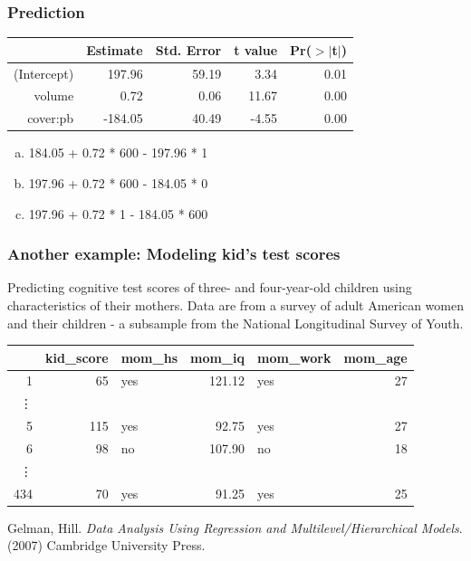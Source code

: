 \begin{frame}
\frametitle{Prediction}


{\small
\begin{center}
\begin{tabular}{rrrrr}
  \hline
 & Estimate & Std. Error & t value & Pr($>$$|$t$|$) \\ 
  \hline
(Intercept) & 197.96 & 59.19 & 3.34 & 0.01 \\ 
  volume & 0.72 & 0.06 & 11.67 & 0.00 \\ 
  cover:pb & -184.05 & 40.49 & -4.55 & 0.00 \\ 
   \hline
\end{tabular}
\end{center}
}

\begin{enumerate}[(a)]
 
\item 184.05 + 0.72 * 600 - 197.96 * 1
\item 197.96 + 0.72 * 600 - 184.05 * 0
\item 197.96 + 0.72 * 1 - 184.05 * 600
\end{enumerate}

\end{frame}


\begin{frame}
\frametitle{Another example: Modeling kid's test scores}

Predicting cognitive test scores of three- and four-year-old children using characteristics of their mothers. Data are from a survey of adult American women and their children - a subsample from the National Longitudinal Survey of Youth.

{\small
\begin{center}
\begin{tabular}{rrlrlr}
  \hline
 & kid\_score & mom\_hs & mom\_iq & mom\_work & mom\_age \\ 
  \hline
1 &  65 & yes & 121.12 & yes &  27 \\ 
  \vdots \\
  5 & 115 & yes & 92.75 & yes &  27 \\ 
  6 &  98 & no & 107.90 & no &  18 \\ 
  \vdots \\
  434 &  70 & yes & 91.25 & yes &  25 \\ 
   \hline
\end{tabular}
\end{center}
}

\vfill

{\tiny Gelman, Hill. \textit{Data Analysis Using Regression and Multilevel/Hierarchical Models}. (2007) Cambridge University Press.}

\end{frame}


